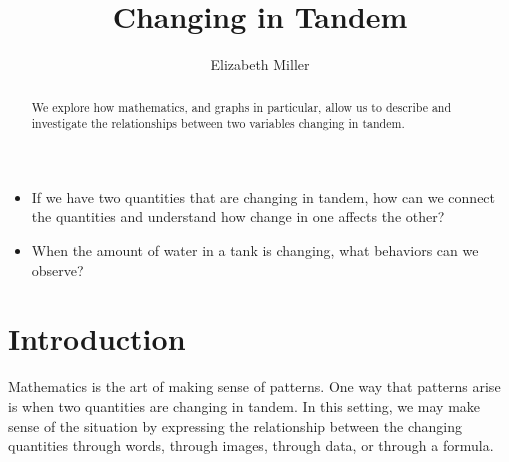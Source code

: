 \documentclass{ximera}
\author{Elizabeth Miller}
\title{Changing in Tandem}
\begin{document}
\begin{abstract}
  We explore how mathematics, and graphs in particular, allow us to describe and investigate the relationships between two variables changing in tandem.
\end{abstract}
\maketitle



\begin{motivatingQuestions}
  \begin{itemize}
\item If we have two quantities that are changing in tandem, how can
  we connect the quantities and understand how change in one affects
  the other?
\item When the amount of water in a tank is changing, what behaviors
  can we observe?
  \end{itemize}
\end{motivatingQuestions}



\section{Introduction}
Mathematics is the art of making sense of patterns.  One way that patterns arise is when two quantities are changing in tandem.  In this setting, we may make sense of the situation by expressing the relationship between the changing quantities through words, through images, through data, or through a formula.%
\end{document}
